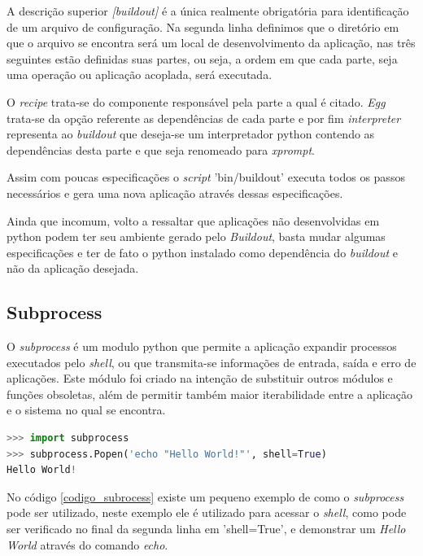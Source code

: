 A descrição superior \textit{[buildout]} é a única realmente obrigatória para identificação de um arquivo de configuração. Na segunda linha definimos que o diretório em que o arquivo se encontra será um local de desenvolvimento da aplicação, nas três seguintes estão definidas suas partes, ou seja, a ordem em que cada parte, seja uma operação ou aplicação acoplada, será executada.

O \textit{recipe} trata-se do componente responsável pela parte a qual é citado. \textit{Egg} trata-se da opção referente as dependências de cada parte e por fim \textit{interpreter} representa ao \textit{buildout} que deseja-se um interpretador python contendo as dependências desta parte e que seja renomeado para \textit{xprompt}.

Assim com poucas especificações o \textit{script} 'bin/buildout' executa todos os passos necessários e gera uma nova aplicação através dessas especificações.

Ainda que incomum, volto a ressaltar que aplicações não desenvolvidas em python podem ter seu ambiente gerado pelo \textit{Buildout}, basta mudar algumas especificações e ter de fato o python instalado como dependência do \textit{buildout} e não da aplicação desejada.

\subsection{Subprocess}

O \textit{subprocess} é um modulo python que permite a aplicação expandir processos executados pelo \textit{shell}, ou que transmita-se informações de entrada, saída e erro de aplicações. Este módulo foi criado na intenção de substituir outros módulos e funções obsoletas, além de permitir também maior iterabilidade entre a aplicação e o sistema no qual se encontra.

{\singlespace
\begin{lstlisting}[caption=Exemplo de uso do \textit{subprocess},language=python,label={codigo_subrocess}]
>>> import subprocess
>>> subprocess.Popen('echo "Hello World!"', shell=True)
Hello World!
\end{lstlisting}
}

No código \ref{codigo_subrocess} existe um pequeno exemplo de como o \textit{subprocess} pode ser utilizado, neste exemplo ele é utilizado para acessar o \textit{shell}, como pode ser verificado no final da segunda linha em 'shell=True', e demonstrar um \textit{Hello World} através do comando \textit{echo}.

